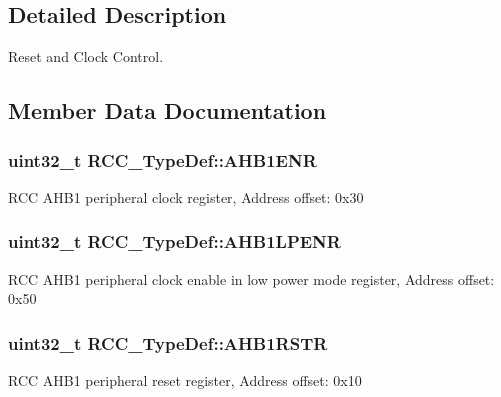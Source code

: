 \subsection{Detailed Description}
Reset and Clock Control. 

\subsection{Member Data Documentation}
\subsubsection[{\texorpdfstring{A\+H\+B1\+E\+NR}{AHB1ENR}}]{ uint32\+\_\+t R\+C\+C\+\_\+\+Type\+Def\+::\+A\+H\+B1\+E\+NR}\hypertarget{struct_r_c_c___type_def_af58a7ad868f07f8759eac3e31b6fa79e}{}\label{struct_r_c_c___type_def_af58a7ad868f07f8759eac3e31b6fa79e}
R\+CC A\+H\+B1 peripheral clock register, Address offset\+: 0x30 
\subsubsection[{\texorpdfstring{A\+H\+B1\+L\+P\+E\+NR}{AHB1LPENR}}]{ uint32\+\_\+t R\+C\+C\+\_\+\+Type\+Def\+::\+A\+H\+B1\+L\+P\+E\+NR}\hypertarget{struct_r_c_c___type_def_a89d6c21f02196b7f59bcc30c1061dd87}{}\label{struct_r_c_c___type_def_a89d6c21f02196b7f59bcc30c1061dd87}
R\+CC A\+H\+B1 peripheral clock enable in low power mode register, Address offset\+: 0x50 
\subsubsection[{\texorpdfstring{A\+H\+B1\+R\+S\+TR}{AHB1RSTR}}]{ uint32\+\_\+t R\+C\+C\+\_\+\+Type\+Def\+::\+A\+H\+B1\+R\+S\+TR}\hypertarget{struct_r_c_c___type_def_ad6abf71a348744aa3f2b7e8b214c1ca4}{}\label{struct_r_c_c___type_def_ad6abf71a348744aa3f2b7e8b214c1ca4}
R\+CC A\+H\+B1 peripheral reset register, Address offset\+: 0x10 
